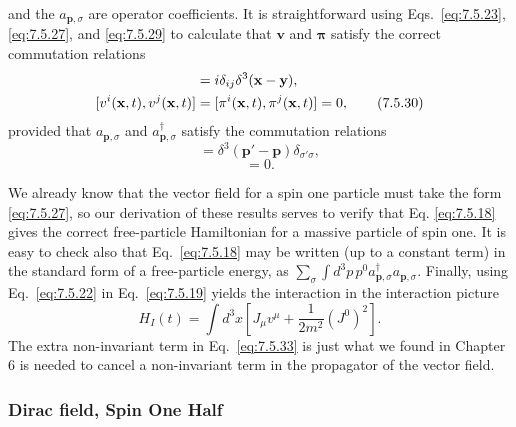 and the $a_{\mathbf p,\sigma}$ are operator coefficients. It is straightforward
using Eqs.~\eqref{eq:7.5.23}, \eqref{eq:7.5.27}, and \eqref{eq:7.5.29} to calculate that $\mathbf v$ and
$\boldsymbol\pi$ satisfy the correct commutation relations
\begin{align}
[v^i(\mathbf x,t),\pi^j(\mathbf y,t)]&=i\delta_{ij}\delta^3(\mathbf x-\mathbf y),
\notag\\
[v^i(\mathbf x,t),v^j(\mathbf x,t)]
&=[\pi^i(\mathbf x,t),\pi^j(\mathbf x,t)]=0,
\tag{7.5.30}\label{eq:7.5.30}
\end{align}
provided that $a_{\mathbf p,\sigma}$ and $a^\dagger_{\mathbf p,\sigma}$ satisfy
the commutation relations
\begin{equation}
[a_{\mathbf p,\sigma},a^\dagger_{\mathbf p',\sigma'}]
=\delta^3(\mathbf p'-\mathbf p)\delta_{\sigma'\sigma},
\tag{7.5.31}\label{eq:7.5.31}
\end{equation}
\begin{equation}
[a_{\mathbf p,\sigma},a_{\mathbf p',\sigma'}]=0.
\tag{7.5.32}\label{eq:7.5.32}
\end{equation}

We already know that the vector field for a spin one particle must take the
form \eqref{eq:7.5.27}, so our derivation of these results serves to verify that Eq.
\eqref{eq:7.5.18} gives the correct free-particle Hamiltonian for a massive particle
of spin one. It is easy to check also that Eq.~\eqref{eq:7.5.18} may be written (up to
a constant term) in the standard form of a free-particle energy, as
$\sum_\sigma\int d^3p\,p^0a^\dagger_{\mathbf p,\sigma}a_{\mathbf p,\sigma}$.
Finally, using Eq.~\eqref{eq:7.5.22} in Eq.~\eqref{eq:7.5.19} yields the interaction in the
interaction picture
\begin{equation}
H_I(t)=\int d^3x\left[J_\mu v^\mu+\frac1{2m^2}(J^0)^2\right].
\tag{7.5.33}\label{eq:7.5.33}
\end{equation}
The extra non-invariant term in Eq.~\eqref{eq:7.5.33} is just what we found in Chapter
6 is needed to cancel a non-invariant term in the propagator of the vector
field.

\subsubsection*{Dirac field, Spin One Half}

